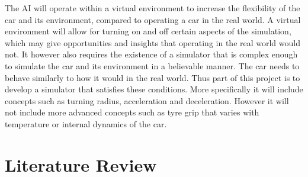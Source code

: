 The AI will operate within a virtual environment to increase the flexibility of the car and its environment, compared to operating a car in the real world. A virtual environment will allow for turning on and off certain aspects of the simulation, which may give opportunities and insights that operating in the real world would not. It however also requires the existence of a simulator that is complex enough to simulate the car and its environment in a believable manner. The car needs to behave similarly to how it would in the real world. Thus part of this project is to develop a simulator that satisfies these conditions. More specifically it will include concepts such as turning radius, acceleration and deceleration. However it will not include more advanced concepts such as tyre grip that varies with temperature or internal dynamics of the car.




\section{Literature Review}
